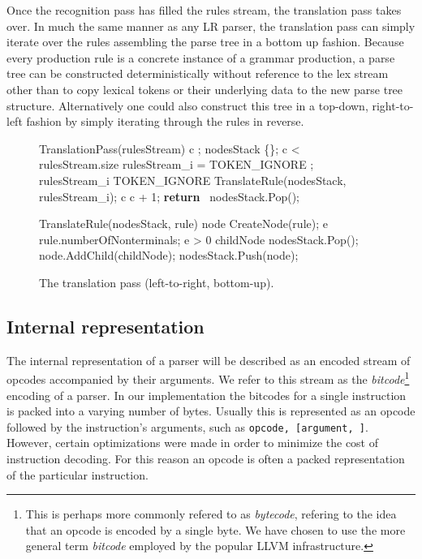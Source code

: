 \documentclass[a4paper,11pt]{article}
\begin{document}
Once the recognition pass has filled the rules stream, the translation pass takes over. 
In much the same manner as any LR parser, the translation pass can simply iterate over the rules assembling the parse tree in a bottom up fashion. 
Because every production rule is a concrete instance of a grammar production, a parse tree can be constructed deterministically without reference to the lex stream 
other than to copy lexical tokens or their underlying data to the new parse tree structure.
Alternatively one could also construct this tree in a top-down, right-to-left fashion by simply iterating through the rules in reverse.
\begin{figure}[!ht]
\centering
\begin{gcl}
\PROC TranslationPass(rulesStream)
  c ;
  nodesStack \becomes \{\};
  \DO c < rulesStream.size \rightarrow
    \IF rulesStream_i = TOKEN\_IGNORE \rightarrow
    \quad \SKIP;
    \BAR rulesStream_i \neq TOKEN\_IGNORE \rightarrow
    \quad TranslateRule(nodesStack, rulesStream_i);
    \FI
    c \becomes c + 1;
  \OD
  \textbf{return} \ nodesStack.Pop();
\CORP

\PROC Translate\!Rule(nodesStack, rule)
  node \becomes CreateN\!ode(rule);
  e \becomes rule.numberO\!f\!Nonterminals;
  \DO e > 0 \rightarrow
  \quad childNode \becomes nodesStack.Pop();
  \quad node.AddChild(childNode);
  \OD
  nodesStack.Push(node);
\CORP
\end{gcl}

\vspace{-2.5\baselineskip}
\caption{The translation pass (left-to-right, bottom-up).}
\end{figure}

\subsection{Internal representation}
The internal representation of a parser will be described as an encoded stream of opcodes accompanied by their arguments. 
We refer to this stream as the \emph{bitcode}\footnote{This is perhaps more commonly refered to as \emph{bytecode}, refering to the idea that an opcode is encoded by a single byte. We have chosen to use the more general term \emph{bitcode} employed by the popular LLVM infrastructure.} encoding of a parser.
In our implementation the bitcodes for a single instruction is packed into a varying number of bytes.
Usually this is represented as an opcode followed by the instruction's arguments, such as \texttt{opcode, [argument, \textellipsis]}.
However, certain optimizations were made in order to minimize the cost of instruction decoding. 
For this reason an opcode is often a packed representation of the particular instruction.
\end{document}
